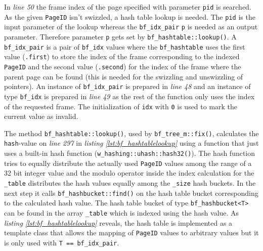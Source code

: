 	In \emph{line 50} the frame index of the page specified with parameter \lstinline{pid} is searched. As the given \lstinline{PageID} isn't swizzled, a hash table lookup is needed. The \lstinline{pid} is the input parameter of the lookup whereas the \lstinline{bf_idx_pair} \lstinline{p} is needed as an output parameter. Therefore parameter \lstinline{p} gets set by \lstinline{bf_hashtable::lookup()}. A \lstinline{bf_idx_pair} is a pair of \lstinline{bf_idx} values where the \lstinline{bf_hashtable} uses the first value (\lstinline{.first}) to store the index of the frame corresponding to the indexed \lstinline{PageID} and the second value (\lstinline{.second}) for the index of the frame where the parent page can be found (this is needed for the swizzling and unswizzling of pointers). An instance of \lstinline{bf_idx_pair} is prepared in \emph{line 48} and an instance of type \lstinline{bf_idx} is prepared in \emph{line 49} as the rest of the function only uses the index of the requested frame. The initialization of \lstinline{idx} with \lstinline{0} is used to mark the current value as invalid.
	
\begin{@empty}
	\lstset{
		language = [ISO]C++,
		style = basic
	}
	\begin{code}[ht!]
		\caption{Implementation of \lstinline{bf_hashtable::lookup()}} \label{lst:bf_hashtablelookup}
		
	\end{code}
\end{@empty}
	
	The method \lstinline{bf_hashtable::lookup()}, used by \lstinline{bf_tree_m::fix()}, calculates the \lstinline{hash}-value on \emph{line 297} in \emph{listing \ref{lst:bf_hashtablelookup}} using a function that just uses a built-in hash function (\lstinline{w_hashing::uhash::hash32()}). The hash function tries to equally distribute the actually used \lstinline{PageID} values among the range of a 32 bit integer value and the modulo operator inside the index calculation for the \lstinline{_table} distributes the hash values equally among the \lstinline{_size} hash buckets. In the next step it calls \lstinline{bf_hashbucket::find()} on the hash table bucket corresponding to the calculated hash value. The hash table bucket of type \lstinline{bf_hashbucket<T>} can be found in the array \lstinline{_table} which is indexed using the hash value. As  \emph{listing \ref{lst:bf_hashtablelookup}} reveals, the hash table is implemented as a template class that allows the mapping of \lstinline{PageID} values to arbitrary values but it is only used with \lstinline{T == bf_idx_pair}.
	
